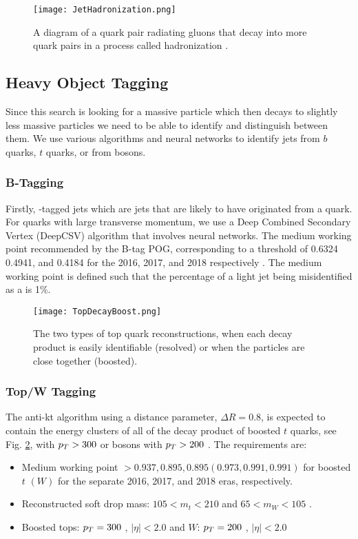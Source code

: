 \begin{figure}
 	\centering
	\texttt{[image: JetHadronization.png]}
 	\caption[Jet Hadronization]{A diagram of a quark pair radiating gluons that decay into more quark pairs in a process called hadronization \cite{griffiths_introduction_2008}.}
 	\label{JetHadronization} 
\end{figure}

\subsection{Heavy Object Tagging}\label{HeavyObject}
Since this search is looking for a massive particle which then decays to slightly less massive particles we need to be able to identify and distinguish between them. We use various algorithms and neural networks to identify jets from $b$ quarks, $t$ quarks, or from \W {} bosons. 

\subsubsection{B-Tagging}\label{Btagging}
Firstly, \B-tagged jets which are jets that are likely to have originated from a \B{} quark. For \B{} quarks with large transverse momentum, we use a Deep Combined Secondary Vertex (DeepCSV) algorithm that involves neural networks\cite{noauthor_performance_nodate}. The medium working point recommended by the B-tag POG, corresponding to a threshold of 0.6324 0.4941, and 0.4184 for the 2016, 2017, and 2018 respectively \cite{noauthor_btagrecommendation2016legacy_nodate, noauthor_btagrecommendation94x_nodate, noauthor_btagrecommendation102x_nodate}. The medium working point is defined such that the percentage of a light jet being misidentified as a \bjet{} is 1\%.

\begin{figure}
 	\centering
	\texttt{[image: TopDecayBoost.png]}
 	\caption[Top Decays]{The two types of top quark reconstructions, when each decay product is easily identifiable (resolved) or when the particles are close together (boosted).}
 	\label{TopDecays} 
\end{figure}

\subsubsection{Top/W Tagging}\label{TopTagging}
The anti-kt algorithm using a distance parameter, $\Delta R=0.8$, is expected to contain the energy clusters of all of the decay product of boosted $t$ quarks, see Fig. \ref{TopDecays}, with $p_{T}>300$ \GeV{} or \W{} bosons with $p_{T}>200$ \GeV. The requirements are:
\begin{itemize}
	\item Medium working point $>0.937, 0.895, 0.895 (0.973, 0.991, 0.991)$ for boosted $t$ $(W)$ for the separate 2016, 2017, and 2018 eras, respectively.
	\item Reconstructed soft drop\cite{noauthor_soft_nodate} mass: $105<m_t<210$ \GeV{} and $65<m_W<105$ \GeV.
	\item Boosted tops: $p_{T}=300$ \GeV, $|\eta|<2.0$ and $W$: $p_{T}=200$ \GeV, $|\eta|<2.0$
\end{itemize}

